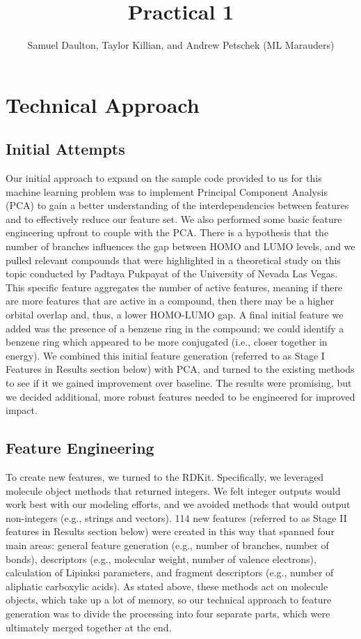 \documentclass[11pt, oneside]{article}   	%
\title{Practical 1}
\author{Samuel Daulton, Taylor Killian, and Andrew Petschek (ML Marauders)}
\begin{document}
\maketitle
\section{Technical Approach}
\subsection{Initial Attempts} 


Our initial approach to expand on the sample code provided to us for this machine learning problem was to implement Principal Component Analysis (PCA) to gain a better understanding of the interdependencies between features and to effectively reduce our feature set. We also performed some basic feature engineering upfront to couple with the PCA. There is a hypothesis that the number of branches influences the gap between HOMO and LUMO levels, and we pulled relevant compounds that were highlighted in a theoretical study on this topic conducted by Padtaya Pukpayat of the University of Nevada Las Vegas. This specific feature aggregates the number of active features, meaning if there are more features that are active in a compound, then there may be a higher orbital overlap and, thus, a lower HOMO-LUMO gap. A final initial feature we added was the presence of a benzene ring in the compound; we could identify a benzene ring which appeared to be more conjugated (i.e., closer together in energy). We combined this initial feature generation (referred to as Stage I Features in Results section below) with PCA, and turned to the existing methods to see if it we gained improvement over baseline. The results were promising, but we decided additional, more robust features needed to be engineered for improved impact. 

\subsection{Feature Engineering} 

To create new features, we turned to the RDKit. Specifically, we leveraged molecule object methods that returned integers. We felt integer outputs would work best with our modeling efforts, and we avoided methods that would output non-integers (e.g., strings and vectors). 114 new features (referred to as Stage II features in Results section below) were created in this way that spanned four main areas: general feature generation (e.g., number of branches, number of bonds), descriptors (e.g., molecular weight, number of valence electrons), calculation of Lipinksi parameters, and fragment descriptors (e.g., number of aliphatic carboxylic acids). As stated above, these methods act on molecule objects, which take up a lot of memory, so our technical approach to feature generation was to divide the processing into four separate parts, which were ultimately merged together at the end. 
\end{document}
